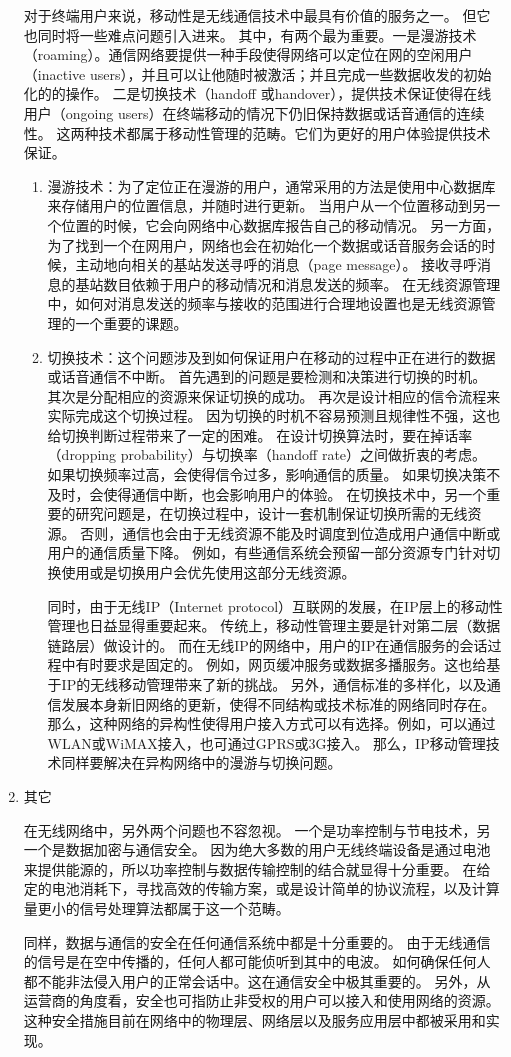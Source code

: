 \begin{enumerate}[1)]
对于终端用户来说，移动性是无线通信技术中最具有价值的服务之一。
但它也同时将一些难点问题引入进来。
其中，有两个最为重要。一是漫游技术（roaming）。通信网络要提供一种手段使得网络可以定位在网的空闲用户（inactive users），并且可以让他随时被激活；并且完成一些数据收发的初始化的的操作。
二是切换技术（handoff 或handover），提供技术保证使得在线用户（ongoing users）在终端移动的情况下仍旧保持数据或话音通信的连续性。
这两种技术都属于移动性管理的范畴。它们为更好的用户体验提供技术保证。
\begin{enumerate}[(1)]
\item 漫游技术：为了定位正在漫游的用户，通常采用的方法是使用中心数据库来存储用户的位置信息，并随时进行更新。
当用户从一个位置移动到另一个位置的时候，它会向网络中心数据库报告自己的移动情况。
另一方面，为了找到一个在网用户，网络也会在初始化一个数据或话音服务会话的时候，主动地向相关的基站发送寻呼的消息（page message）。
接收寻呼消息的基站数目依赖于用户的移动情况和消息发送的频率。
在无线资源管理中，如何对消息发送的频率与接收的范围进行合理地设置也是无线资源管理的一个重要的课题。
\item 切换技术：这个问题涉及到如何保证用户在移动的过程中正在进行的数据或话音通信不中断。
首先遇到的问题是要检测和决策进行切换的时机。
其次是分配相应的资源来保证切换的成功。
再次是设计相应的信令流程来实际完成这个切换过程。
因为切换的时机不容易预测且规律性不强，这也给切换判断过程带来了一定的困难。
在设计切换算法时，要在掉话率（dropping probability）与切换率（handoff rate）之间做折衷的考虑。
如果切换频率过高，会使得信令过多，影响通信的质量。
如果切换决策不及时，会使得通信中断，也会影响用户的体验。
在切换技术中，另一个重要的研究问题是，在切换过程中，设计一套机制保证切换所需的无线资源。
否则，通信也会由于无线资源不能及时调度到位造成用户通信中断或用户的通信质量下降。
例如，有些通信系统会预留一部分资源专门针对切换使用或是切换用户会优先使用这部分无线资源。

同时，由于无线IP（Internet protocol）互联网的发展，在IP层上的移动性管理也日益显得重要起来。
传统上，移动性管理主要是针对第二层（数据链路层）做设计的。
而在无线IP的网络中，用户的IP在通信服务的会话过程中有时要求是固定的。
例如，网页缓冲服务或数据多播服务。这也给基于IP的无线移动管理带来了新的挑战。
另外，通信标准的多样化，以及通信发展本身新旧网络的更新，使得不同结构或技术标准的网络同时存在。那么，这种网络的异构性使得用户接入方式可以有选择。例如，可以通过WLAN或WiMAX接入，也可通过GPRS或3G接入。
那么，IP移动管理技术同样要解决在异构网络中的漫游与切换问题。
\end{enumerate}
%
\item 其它
\par 在无线网络中，另外两个问题也不容忽视。
一个是功率控制与节电技术，另一个是数据加密与通信安全。
因为绝大多数的用户无线终端设备是通过电池来提供能源的，所以功率控制与数据传输控制的结合就显得十分重要。
在给定的电池消耗下，寻找高效的传输方案，或是设计简单的协议流程，以及计算量更小的信号处理算法都属于这一个范畴。

同样，数据与通信的安全在任何通信系统中都是十分重要的。
由于无线通信的信号是在空中传播的，任何人都可能侦听到其中的电波。
如何确保任何人都不能非法侵入用户的正常会话中。这在通信安全中极其重要的。
另外，从运营商的角度看，安全也可指防止非受权的用户可以接入和使用网络的资源。
这种安全措施目前在网络中的物理层、网络层以及服务应用层中都被采用和实现。
\end{enumerate}
